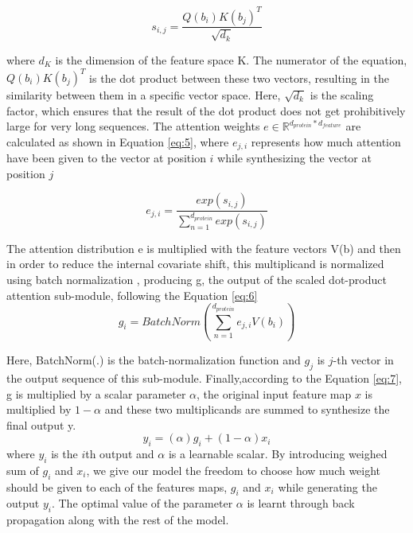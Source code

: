 \documentclass[8pt]{article}
\begin{document}
\begin{multicols}{2}
\begin{equation}
s_{i,j} = \frac{Q(b_i) K(b_j)^T}{ \sqrt{d_k} }
\label{eq:eq4}
\end{equation}

where $d_K$ is the dimension of the feature space K. The numerator of
the equation,$Q(b_i) K(b_j)^T$ is the dot product between these two vectors, resulting in the similarity between them in a specific vector
space. Here, $\sqrt{d_k}$  is the scaling factor, which ensures that the result
of the dot product does not get prohibitively large for very long
sequences.
The attention weights $e \in \mathbb{R}^{d_{protein} * d_{feature}} $ are calculated as shown
in Equation \eqref{eq:5}, where $e_{j,i}$ represents how much attention have been
given to the vector at position  $i$ while synthesizing the vector at position  $j$ 

\begin{equation}
e_{j,i} = \frac{exp(s_{i,j})}{ \sum_{n=1}^{d_{protein}} exp(s_{i,j}) }
\label{eq:5}
\end{equation}

The attention distribution e is multiplied with the feature vectors
V(b) and then in order to reduce the internal covariate shift, this
multiplicand is normalized using batch normalization \cite{ioffe2015batch}, producing g, the output of the scaled dot-product
attention sub-module, following the Equation \eqref{eq:6}
\begin{equation}
g_{i} = BatchNorm(\sum_{n=1}^{d_{protein}} e_{j,i} V(b_i)  )
\label{eq:6}
\end{equation}

Here, BatchNorm(.) is the batch-normalization function and $g_j$   is
$j$-th vector in the output sequence of this sub-module. Finally,according to the Equation \eqref{eq:7}, g is multiplied by a scalar parameter
$\alpha$, the original input feature map $x$ is multiplied by $1-\alpha$ and these
two multiplicands are summed to synthesize the final output y.
\begin{equation}
y_{i} = (\alpha)g_i  + (1-\alpha)x_i
\label{eq:7}
\end{equation}
where $y_i$ is the $i$th output and $\alpha$ is a learnable scalar. By introducing
weighed sum of $g_i$ and $x_i$, we give our model the freedom to choose
how much weight should be given to each of the features maps, $g_i$
and $x_i$ while generating the output  $y_i$. The optimal value of the parameter  $\alpha$ is learnt through back propagation along with the rest of
the model.
\end{multicols}
\end{document}
